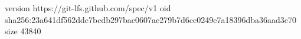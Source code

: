 version https://git-lfs.github.com/spec/v1
oid sha256:23a641df562ddc7bcdb297bac0607ae279b7d6cc0249e7a18396dba36aad3c70
size 43840
